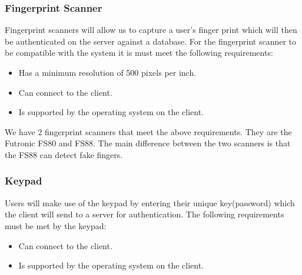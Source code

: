 	\subsubsection{Fingerprint Scanner}
	Fingerprint scanners will allow us to capture a user's finger print which will then be authenticated on the server against a database. For the fingerprint scanner to be compatible with the system it is must meet the following requirements:
	\begin{itemize}
		\item Has a minimum resolution of 500 pixels per inch.
		\item Can connect to the client.
		\item Is supported by the operating system on the client.
	\end{itemize}
	
We have 2 fingerprint scanners that meet the above requirements. They are the Futronic FS80 and FS88. The main difference between the two scanners is that the FS88 can detect fake fingers.
	
	\subsubsection{Keypad}
	Users will make use of the keypad by entering their unique key(password) which the client will send to a server for authentication. The following requirements must be met by the keypad:
	\begin{itemize}
		\item Can connect to the client.
		\item Is supported by the operating system on the client.
	\end{itemize}


		